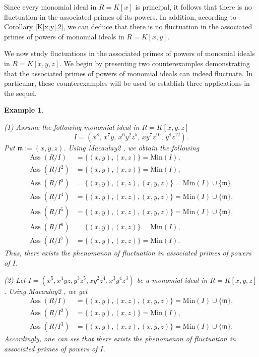 \documentclass[11pt]{amsart}
\newtheorem{example}[theorem]{Example}
\begin{document}
Since every monomial ideal in $R=K[x]$ is principal, it follows that there is no fluctuation in the associated primes of its powers. In addition, according to Corollary \ref{K[x,y].2}, we can deduce that there is no fluctuation in the associated primes of  powers of monomial ideals in $R=K[x,y]$. 

  We now study fluctuations in the associated primes of powers of monomial ideals in $R=K[x,y,z]$. We begin by presenting two counterexamples demonstrating that the associated primes of powers of monomial ideals can indeed fluctuate. In particular, these counterexamples will be used to establish three applications in the sequel. 
  
  
  
  
 \begin{example} \label{Counterexample.1}
{\em 
(1) Assume the following monomial ideal in $R = K[x,y,z]$
$$I=(x^8,\,
x^7y,\,
x^6y^2z^5,\,
xy^7z^{10},\,
y^8z^{12}).$$
Put $\mathfrak{m}:=(x,y,z)$.   Using  \textit{Macaulay2} \cite{GS}, we obtain the following  
\[
\begin{aligned}
\operatorname{Ass}(R/I)
&= \{(x,y),(x,z)\}= \mathrm{Min}(I),\\
\operatorname{Ass}(R/I^2)
&= \{(x,y),(x,z)\}= \mathrm{Min}(I),\\
\operatorname{Ass}(R/I^3)
&= \{(x,y),(x,z),(x,y,z)\}=\mathrm{Min}(I)\cup \{\mathfrak{m}\},\\
\operatorname{Ass}(R/I^4)
&= \{(x,y),(x,z),(x,y,z)\}=\mathrm{Min}(I)\cup \{\mathfrak{m}\},\\
\operatorname{Ass}(R/I^5)
&= \{(x,y),(x,z),(x,y,z)\}=\mathrm{Min}(I)\cup \{\mathfrak{m}\},\\
\operatorname{Ass}(R/I^6)
&= \{(x,y),(x,z)\}= \mathrm{Min}(I),\\
\operatorname{Ass}(R/I^7)
&= \{(x,y),(x,z)\}= \mathrm{Min}(I).
\end{aligned}
\]
Thus, there exists the phenomenon of fluctuation in associated primes of powers of $I$. 
 
  (2) Let $I = (x^5, x^4yz, y^3z^5, xy^2z^4, x^3y^4z^3)$ be a monomial ideal in $R=K[x,y,z]$. 
  Using  \textit{Macaulay2} \cite{GS}, we get
 \[
\begin{aligned}
\operatorname{Ass}(R/I)&=\{(x,y),(x,z), (x,y,z)\}=\mathrm{Min}(I)\cup \{\mathfrak{m}\},\\
\operatorname{Ass}(R/I^2)&=\{(x,y),(x,z)\}=\mathrm{Min}(I),\\
\operatorname{Ass}(R/I^3)&=\{(x,y),(x,z),  (x,y,z)\}=\mathrm{Min}(I)\cup \{\mathfrak{m}\}.
\end{aligned}
\]
 Accordingly, one can see that  there exists the phenomenon of fluctuation in associated primes of powers of $I$. 
 }
 \end{example}
 
\end{document}
